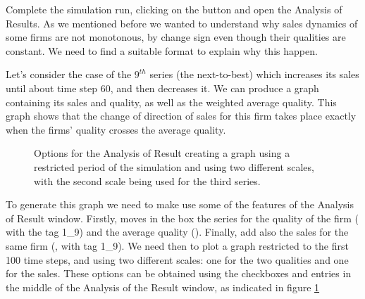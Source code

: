 \documentclass [11pt,a4paper] {book}
\begin{document}
Complete the simulation run, clicking on the button  and open the Analysis of Results. As we mentioned before we wanted to understand why sales dynamics of some firms are not monotonous, by change sign even though their qualities are constant. We need to find a suitable format to explain why this happen.

Let's consider the case of the $9^{th}$ series (the next-to-best) which increases its sales until about time step 60, and then decreases it. We can produce a graph containing its sales and quality, as well as the weighted average quality. This graph shows that the change of direction of sales for this firm takes place exactly when the firms' quality crosses the average quality.

\begin{figure}[ht]
  \centering
  \caption{\small Options for the Analysis of Result creating a graph using a restricted period of the simulation and using two different scales, with the second scale being used for the third series.}
   \label{fig:ansales}
\end{figure}

To generate this graph we need to make use some of the features of the Analysis of Result window. Firstly, moves in the  box the series for the quality of the firm ( with the tag 1\_9) and the average quality (). Finally, add also the sales for the same firm (, with tag 1\_9). We need then to plot a graph restricted to the first 100 time steps, and using two different scales: one for the two qualities and one for the sales. These options can be obtained using the checkboxes and entries in the middle of the Analysis of the Result window, as indicated in figure \ref{fig:ansales}
\end{document}
